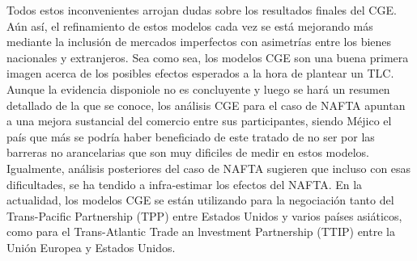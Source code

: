 \documentclass[10pt,a4paper]{article}
\begin{document}
Todos estos inconvenientes arrojan dudas sobre los resultados finales del CGE. Aún así, el refinamiento de estos modelos cada vez se está mejorando más mediante la inclusión de mercados imperfectos con asimetrías entre los bienes nacionales y extranjeros. Sea como sea, los modelos CGE son una buena primera imagen acerca de los posibles efectos esperados a la hora de plantear un TLC. Aunque la evidencia disponiole no es concluyente y luego se hará un resumen detallado de la que se conoce, los análisis CGE para el caso de NAFTA apuntan a una mejora sustancial del comercio entre sus participantes, siendo Méjico el país que más se podría haber beneficiado de este tratado de no ser por las barreras no arancelarias que son muy dificiles de medir en estos modelos. Igualmente, análisis posteriores del caso de NAFTA sugieren que incluso con esas dificultades, se ha tendido a infra-estimar los efectos del NAFTA. En la actualidad, los modelos CGE se están utilizando para la negociación tanto del Trans-Pacific Partnership (TPP) entre Estados Unidos y varios países asiáticos, como para el Trans-Atlantic Trade an lnvestment Partnership (TTIP) entre la Unión Europea y Estados Unidos.
\end{document}
